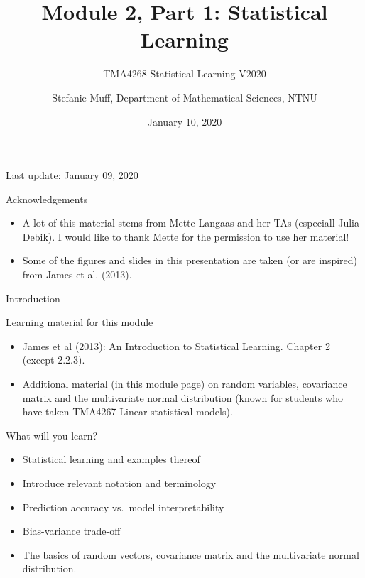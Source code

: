 \documentclass[ignorenonframetext,]{beamer}
\title{Module 2, Part 1: Statistical Learning}
\subtitle{TMA4268 Statistical Learning V2020}
\author{Stefanie Muff, Department of Mathematical Sciences, NTNU}
\date{January 10, 2020}
\providecommand{\tightlist}{%
  \setlength{\itemsep}{0pt}\setlength{\parskip}{0pt}}
\begin{document}
\frame{\titlepage}

\begin{frame}

Last update: January 09, 2020

\end{frame}

\begin{frame}{Acknowledgements}

\begin{itemize}
\item
  A lot of this material stems from Mette Langaas and her TAs (especiall
  Julia Debik). I would like to thank Mette for the permission to use
  her material!
\item
  Some of the figures and slides in this presentation are taken (or are
  inspired) from James et al. (2013).
\end{itemize}

\end{frame}

\begin{frame}{Introduction}

\begin{block}{Learning material for this module}

\begin{itemize}
\tightlist
\item
  James et al (2013): An Introduction to Statistical Learning. Chapter 2
  (except 2.2.3).\\
\item
  Additional material (in this module page) on random variables,
  covariance matrix and the multivariate normal distribution (known for
  students who have taken TMA4267 Linear statistical models).
\end{itemize}

\end{block}

\end{frame}

\begin{frame}

\begin{block}{What will you learn?}

\vspace{2mm}

\begin{itemize}
\item
  Statistical learning and examples thereof \vspace{1mm}
\item
  Introduce relevant notation and terminology \vspace{1mm}
\item
  Prediction accuracy vs.~model interpretability \vspace{1mm}
\item
  Bias-variance trade-off \vspace{1mm}
\item
  The basics of random vectors, covariance matrix and the multivariate
  normal distribution.
\end{itemize}

\end{block}

\end{frame}
\end{document}
